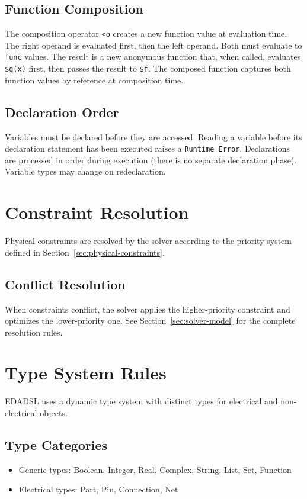 \section{Function Composition}
The composition operator \texttt{<o} creates a new function value at evaluation time. The right operand is evaluated first, then the left operand. Both must evaluate to \texttt{func} values. The result is a new anonymous function that, when called, evaluates \texttt{\$g(x)} first, then passes the result to \texttt{\$f}. The composed function captures both function values by reference at composition time.

\section{Declaration Order}
Variables must be declared before they are accessed. Reading a variable before its declaration statement has been executed raises a \texttt{Runtime Error}. Declarations are processed in order during execution (there is no separate declaration phase). Variable types may change on redeclaration.


\chapter{Constraint Resolution}
Physical constraints are resolved by the solver according to the priority system defined in Section~\ref{sec:physical-constraints}.

\section{Conflict Resolution}
When constraints conflict, the solver applies the higher-priority constraint and optimizes the lower-priority one. See Section~\ref{sec:solver-model} for the complete resolution rules.


\chapter{Type System Rules}
EDADSL uses a dynamic type system with distinct types for electrical and non-electrical objects.

\section{Type Categories}
\begin{itemize}
\item Generic types: Boolean, Integer, Real, Complex, String, List, Set, Function
\item Electrical types: Part, Pin, Connection, Net
\end{itemize}

